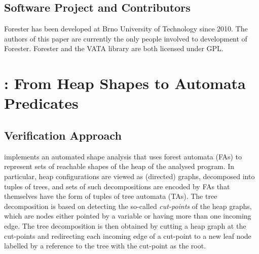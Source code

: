 \subsection{Software Project and Contributors}\label{sec:project_contributors}

Forester has been developed at Brno University of Technology since 2010.  The authors
of this paper are currently the only people involved to development of Forester.
%
Forester and the VATA library are both licensed under GPL.

\newpage
\section{\texorpdfstring{\forester{}}{Forester}: From Heap Shapes to Automata Predicates}

\subsection{Verification Approach} \label{sec:verif_approach}

\forester{} implements an automated shape analysis that uses forest automata (FAs)
to represent sets of reachable shapes of the heap of the analysed program. In
particular, heap configurations are viewed as (directed) graphs, decomposed into
tuples of trees, and sets of such decompositions are encoded by FAs that
themselves have the form of tuples of tree automata (TAs). The tree
decomposition is based on detecting the so-called \emph{cut-points} of the heap
graphs, which are nodes either pointed by a variable or having more than one
incoming edge. The tree decomposition is then obtained by cutting a heap graph
at the cut-points and redirecting each incoming edge of a cut-point to a new
leaf node labelled by a reference to the tree with the cut-point as the root.


